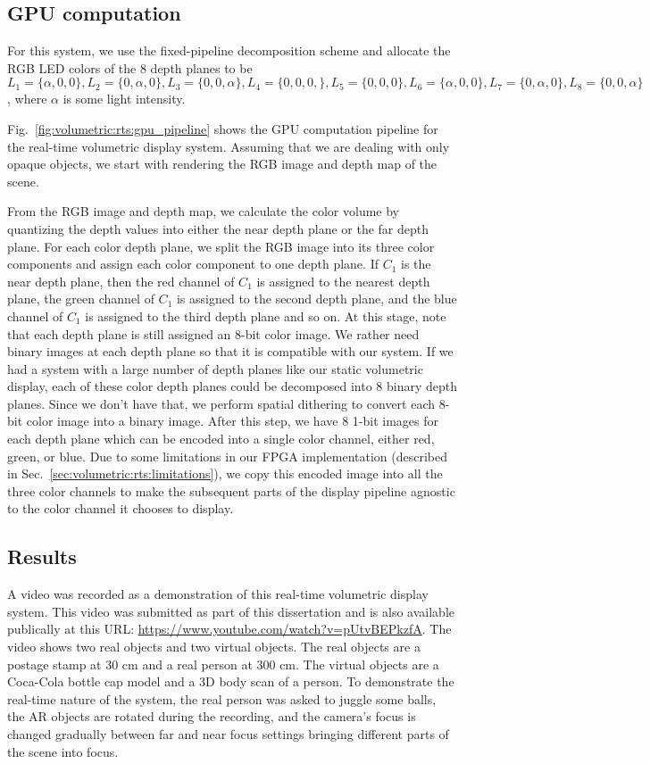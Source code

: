 \subsection{GPU computation}

For this system, we use the fixed-pipeline decomposition scheme and allocate the RGB LED colors of the 8 depth planes to be $L_1 = \{\alpha, 0, 0\}, L_2 = \{0, \alpha, 0\}, L_3 = \{0, 0, \alpha\}, L_4 = \{0, 0, 0,\}, L_5 = \{0, 0, 0\}, L_6 = \{\alpha, 0,0\}, L_7 = \{0, \alpha,0\}, L_8 = \{0, 0, \alpha\}$, where $\alpha$ is some light intensity.

Fig.~\ref{fig:volumetric:rts:gpu_pipeline} shows the GPU computation pipeline for the real-time volumetric display system. Assuming that we are dealing with only opaque objects, we start with rendering the RGB image and depth map of the scene.

From the RGB image and depth map, we calculate the color volume by quantizing the depth values into either the near depth plane or the far depth plane.
For each color depth plane, we split the RGB image into its three color components and assign each color component to one depth plane. 
If $C_1$ is the near depth plane, then the red channel of $C_1$ is assigned to the nearest depth plane, the green channel of $C_1$ is assigned to the second depth plane, and the blue channel of $C_1$ is assigned to the third depth plane and so on.
At this stage, note that each depth plane is still assigned an 8-bit color image.
We rather need binary images at each depth plane so that it is compatible with our system. 
If we had a system with a large number of depth planes like our static volumetric display, each of these color depth planes could be decomposed into 8 binary depth planes.
Since we don't have that, we perform spatial dithering to convert each 8-bit color image into a binary image. 
After this step, we have 8 1-bit images for each depth plane which can be encoded into a single color channel, either red, green, or blue.
Due to some limitations in our FPGA implementation (described in Sec.~\ref{sec:volumetric:rts:limitations}), we copy this encoded image into all the three color channels to make the subsequent parts of the display pipeline agnostic to the color channel it chooses to display.

\subsection{Results}
A video was recorded as a demonstration of this real-time volumetric display system. This video was submitted as part of this dissertation and is also available publically at this URL: \url{https://www.youtube.com/watch?v=pUtvBEPkzfA}. 
The video shows two real objects and two virtual objects. 
The real objects are a postage stamp at 30 cm and a real person at 300 cm.
The virtual objects are a Coca-Cola bottle cap model and a 3D body scan of a person.
To demonstrate the real-time nature of the system, the real person was asked to juggle some balls, the AR objects are rotated during the recording, and the camera's focus is changed gradually between far and near focus settings bringing different parts of the scene into focus.

